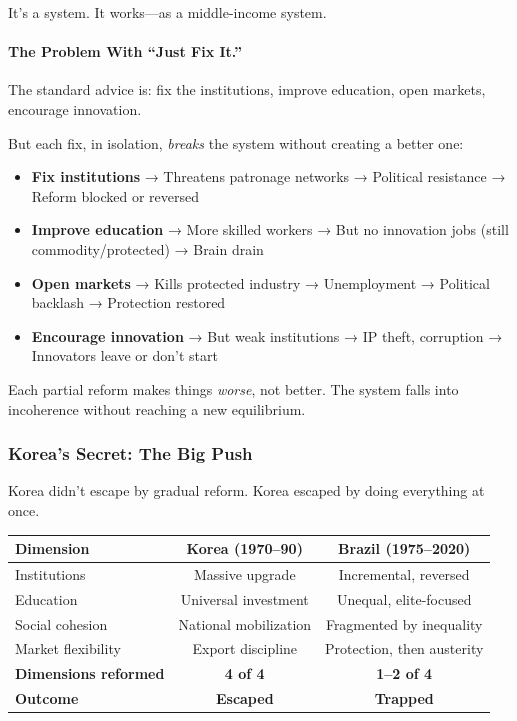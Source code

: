 It's a system. It works---as a middle-income system.

\paragraph{The Problem With ``Just Fix It.''}

The standard advice is: fix the institutions, improve education, open 
markets, encourage innovation.

But each fix, in isolation, \emph{breaks} the system without creating 
a better one:

\begin{itemize}
    \item \textbf{Fix institutions} → Threatens patronage networks → Political 
    resistance → Reform blocked or reversed
    
    \item \textbf{Improve education} → More skilled workers → But no 
    innovation jobs (still commodity/protected) → Brain drain
    
    \item \textbf{Open markets} → Kills protected industry → Unemployment 
    → Political backlash → Protection restored
    
    \item \textbf{Encourage innovation} → But weak institutions → IP theft, 
    corruption → Innovators leave or don't start
\end{itemize}

Each partial reform makes things \emph{worse}, not better. The system 
falls into incoherence without reaching a new equilibrium.

\subsubsection{Korea's Secret: The Big Push}

Korea didn't escape by gradual reform. Korea escaped by doing everything 
at once.

\begin{center}
\renewcommand{\arraystretch}{1.2}
\begin{tabular}{lcc}
\hline
\textbf{Dimension} & \textbf{Korea (1970--90)} & \textbf{Brazil (1975--2020)} \\
\hline
Institutions & Massive upgrade & Incremental, reversed \\
Education & Universal investment & Unequal, elite-focused \\
Social cohesion & National mobilization & Fragmented by inequality \\
Market flexibility & Export discipline & Protection, then austerity \\
\hline
\textbf{Dimensions reformed} & \textbf{4 of 4} & \textbf{1--2 of 4} \\
\textbf{Outcome} & \textbf{Escaped} & \textbf{Trapped} \\
\hline
\end{tabular}
\end{center}

